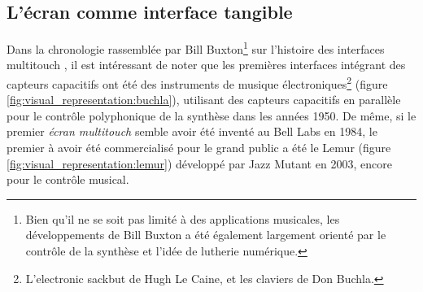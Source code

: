 \subsection{L'écran comme interface tangible}

\noindent Dans la chronologie rassemblée par Bill Buxton\footnote{Bien qu'il ne se soit pas limité à des applications musicales, les développements de Bill Buxton a été également largement orienté par le contrôle de la synthèse et l'idée de lutherie numérique.} sur l'histoire des interfaces multitouch \cite{buxton_multi-touch_2007}, il est intéressant de noter que les premières interfaces intégrant des capteurs capacitifs ont été des instruments de musique électroniques\footnote{L'electronic sackbut de Hugh Le Caine, et les claviers de Don Buchla.} (figure \ref{fig:visual_representation:buchla}), utilisant des capteurs capacitifs en parallèle pour le contrôle polyphonique de la synthèse dans les années 1950. De même, si le premier \textit{écran multitouch} semble avoir été inventé au Bell Labs en 1984, le premier à avoir été commercialisé pour le grand public a été le Lemur (figure \ref{fig:visual_representation:lemur}) développé par Jazz Mutant en 2003, encore pour le contrôle musical.

